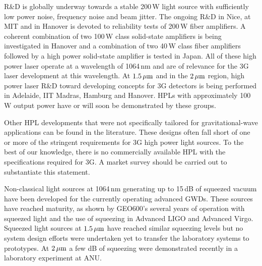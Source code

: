 R\&D is globally underway towards a stable 200\,W light source with sufficiently low power noise, frequency noise and beam jitter. 
The ongoing R\&D in Nice, at MIT and in Hanover is devoted to reliability tests of 200\,W fiber amplifiers. A coherent combination of two 100\,W class solid-state amplifiers is being investigated in Hanover and a combination of two 40\,W class fiber amplifiers followed by a high power solid-state amplifier is tested in Japan. All of these high power laser operate at a wavelength of 1064\,nm and are of relevance for the 3G laser development at this wavelength. At $ 1.5\, {\rm \mu m}$ and in the $ 2\, {\rm \mu m}$ region, high power laser R\&D toward developing concepts for 3G detectors is being performed in Adelaide, IIT Madras, Hamburg and Hanover. HPLs with approximately 100\,W output power have or will soon be demonstrated by these groups. 

Other HPL developments that were not specifically tailored for gravitational-wave applications can be found in the literature. These designs often fall short of one or more of the stringent requirements for 3G high power light sources. To the best of our knowledge, there is no commercially available HPL with the specifications required for 3G. A market survey should be carried out to substantiate this statement.

Non-classical light sources at 1064\,nm generating up to 15\,dB of squeezed vacuum have been developed for the currently operating advanced GWDs. These sources have reached maturity, as shown by GEO600's several years of operation with squeezed light and the use of squeezing in Advanced LIGO and Advanced Virgo. Squeezed light sources at $ 1.5\, {\rm \mu m}$ have reached similar squeezing levels but no system design efforts were undertaken yet to transfer the laboratory systems to prototypes. At $ 2\, {\rm \mu m}$ a few dB of squeezing were demonstrated recently in a laboratory experiment at ANU.

